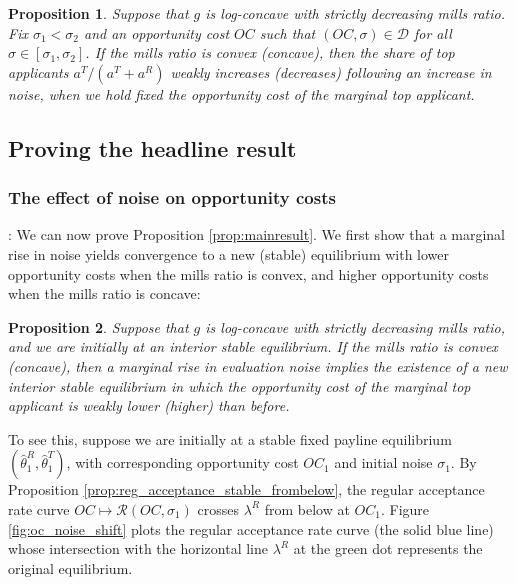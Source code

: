 \documentclass[12pt,reqno]{amsart}
\newtheorem{proposition}{Proposition}
\theoremstyle{definition}
\theoremstyle{plain} %
\begin{document}
\begin{proposition}\label{prop:noiseincrease_ratioapps}
Suppose that $g$ is log-concave with strictly decreasing mills ratio. Fix $\sigma_1<\sigma_2$ and an opportunity cost $OC$ such that $(OC,\sigma)\in\mathcal{D}$ for all $\sigma\in[\sigma_1,\sigma_2]$. If the mills ratio is convex (concave), then the share of top applicants $a^T/(a^T+a^R)$ weakly increases (decreases) following an increase in noise, when we hold fixed the opportunity cost of the marginal top applicant.
\end{proposition}

\subsection{Proving the headline result}



\subsubsection{The effect of noise on opportunity costs}: We can now prove Proposition \ref{prop:mainresult}. We first show that a marginal rise in noise yields convergence to a new (stable) equilibrium with lower opportunity costs when the mills ratio is convex, and higher opportunity costs when the mills ratio is concave:

\begin{proposition}\label{prop:noise_oc}
Suppose that $g$ is log-concave with strictly decreasing mills ratio, and we are initially at an interior stable equilibrium. If the mills ratio is convex (concave), then a marginal rise in evaluation noise implies the existence of a new interior stable equilibrium in which the opportunity cost of the marginal top applicant is weakly lower (higher) than before. 
\end{proposition}

\noindent To see this, suppose we are initially at a stable fixed payline equilibrium $(\hat{\theta}^R_1, \hat{\theta}^T_1)$, with corresponding opportunity cost $OC_1$ and initial noise $\sigma_1$. By Proposition \ref{prop:reg_acceptance_stable_frombelow}, the regular acceptance rate curve $OC\mapsto \mathcal{R}(OC,\sigma_1)$ crosses $\lambda^R$ from below at $OC_1$. Figure \ref{fig:oc_noise_shift} plots the regular acceptance rate curve (the solid blue line) whose intersection with the horizontal line $\lambda^R$ at the green dot represents the original equilibrium. 
\end{document}
